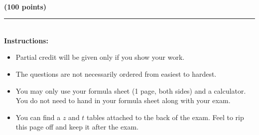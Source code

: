 \documentclass[12pt]{article}
\begin{document}
\begin{center}
  \textbf{\large \semester{}} \hfill \textbf{\large \class{}} \hfill \textbf{\large \exam{}}\\
  \hfill \textbf{(100 points)}
\end{center}

\vspace*{1in}

 \rule{5in}{.01in}\\[1in]

\textbf{Instructions:}\\
\begin{itemize}
\item {\large Partial credit will be given only if you show your work.}
\item {\large The questions are not necessarily ordered from easiest to hardest.}
\item {\large You may only use your formula sheet (1 page, both sides) and a calculator. You do not need to hand in your formula sheet along with your exam.}
\item {\large You can find a $z$ and $t$ tables attached to the back of the exam. Feel to rip this page off and keep it after the exam.}
\end{itemize}
\end{document}
